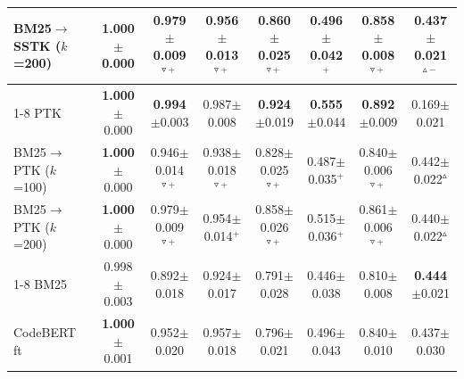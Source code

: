 \begin{table}[!htbp]
\begin{tabular}{lccccccc}
\quad BM25$\rightarrow$SSTK ($k$=200) & \textbf{1.000}$\pm$0.000 & 0.979$\pm$0.009$^{\triangledown+}$ & 0.956$\pm$0.013$^{\triangledown+}$ & 0.860$\pm$0.025$^{\triangledown+}$ & 0.496$\pm$0.042$^{+}$ & 0.858$\pm$0.008$^{\triangledown+}$ & 0.437$\pm$0.021$^{\vartriangle-}$ \\
\cmidrule(lr){1-8}
\quad PTK & \textbf{1.000}$\pm$0.000 & \textbf{0.994}$\pm$0.003 & 0.987$\pm$0.008 & \textbf{0.924}$\pm$0.019 & \textbf{0.555}$\pm$0.044 & \textbf{0.892}$\pm$0.009 & 0.169$\pm$0.021 \\
\quad BM25$\rightarrow$PTK ($k$=100) & \textbf{1.000}$\pm$0.000 & 0.946$\pm$0.014$^{\triangledown+}$ & 0.938$\pm$0.018$^{\triangledown+}$ & 0.828$\pm$0.025$^{\triangledown+}$ & 0.487$\pm$0.035$^{+}$ & 0.840$\pm$0.006$^{\triangledown+}$ & 0.442$\pm$0.022$^{\vartriangle}$ \\
\quad BM25$\rightarrow$PTK ($k$=200) & \textbf{1.000}$\pm$0.000 & 0.979$\pm$0.009$^{\triangledown+}$ & 0.954$\pm$0.014$^{+}$ & 0.858$\pm$0.026$^{\triangledown+}$ & 0.515$\pm$0.036$^{+}$ & 0.861$\pm$0.006$^{\triangledown+}$ & 0.440$\pm$0.022$^{\vartriangle}$ \\
\cmidrule(lr){1-8}
\quad BM25 & 0.998$\pm$0.003 & 0.892$\pm$0.018 & 0.924$\pm$0.017 & 0.791$\pm$0.028 & 0.446$\pm$0.038 & 0.810$\pm$0.008 & \textbf{0.444}$\pm$0.021 \\
\quad CodeBERT ft & \textbf{1.000}$\pm$0.001 & 0.952$\pm$0.020 & 0.957$\pm$0.018 & 0.796$\pm$0.021 & 0.496$\pm$0.043 & 0.840$\pm$0.010 & 0.437$\pm$0.030 \\
\bottomrule
\end{tabular}
\end{table}

